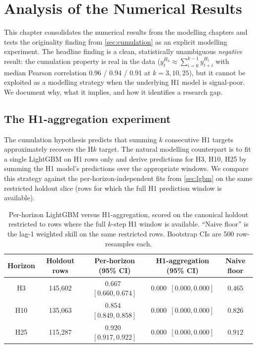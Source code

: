\section{Analysis of the Numerical Results}
\label{sec:analysis}

This chapter consolidates the numerical results from the modelling chapters and tests the originality finding from \cref{sec:cumulation} as an explicit modelling experiment. The headline finding is a clean, statistically unambiguous \emph{negative} result: the cumulation property is real in the data ($y^{H_k}_t \approx \sum_{i=0}^{k-1} y^{H_1}_{t+i}$ with median Pearson correlation 0.96 / 0.94 / 0.91 at $k = 3, 10, 25$), but it cannot be exploited as a modelling strategy when the underlying H1 model is signal-poor. We document why, what it implies, and how it identifies a research gap.

\subsection{The H1-aggregation experiment}
\label{sec:analysis:h1agg}

The cumulation hypothesis predicts that summing $k$ consecutive H1 targets approximately recovers the H$k$ target. The natural modelling counterpart is to fit a single LightGBM on H1 rows only and derive predictions for H3, H10, H25 by summing the H1 model's predictions over the appropriate windows. We compare this strategy against the per-horizon-independent fits from \cref{sec:lgbm} on the same restricted holdout slice (rows for which the full H1 prediction window is available).

\begin{table}[h]
\centering
\caption{Per-horizon LightGBM versus H1-aggregation, scored on the canonical holdout restricted to rows where the full $k$-step H1 window is available. ``Naive floor'' is the lag-1 weighted skill on the same restricted rows. Bootstrap CIs are 500 row-resamples each.}
\label{tab:h1_aggregation_leaderboard}
\begin{tabular}{c c c c c}
\toprule
Horizon & Holdout rows & Per-horizon (95\% CI) & H1-aggregation (95\% CI) & Naive floor \\
\midrule
H3  & 145{,}602 & $0.667$ \,$[0.660, 0.674]$ & $0.000$ \,$[0.000, 0.000]$ & $0.465$ \\
H10 & 135{,}063 & $0.854$ \,$[0.849, 0.858]$ & $0.000$ \,$[0.000, 0.000]$ & $0.826$ \\
H25 & 115{,}287 & $0.920$ \,$[0.917, 0.922]$ & $0.000$ \,$[0.000, 0.000]$ & $0.912$ \\
\bottomrule
\end{tabular}
\end{table}

